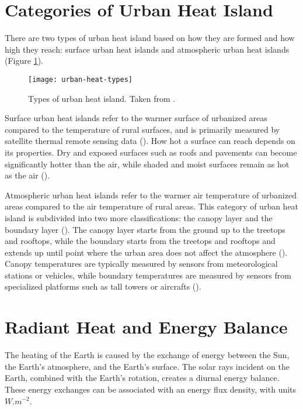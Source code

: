 \section{Categories of Urban Heat Island}
	
	There are two types of urban heat island based on how they are formed and how high they reach:
	surface urban heat islands and atmospheric urban heat islands (Figure \ref{fig:urban-heat-types}).
	
	\begin{figure}
		\centering
		\texttt{[image: urban-heat-types]}
		\caption{Types of urban heat island. Taken from \textcite{Khan2021}.}
		\label{fig:urban-heat-types}
	\end{figure}
	
	Surface urban heat islands refer to the warmer surface of urbanized areas compared to the temperature of rural surfaces, and is primarily measured by satellite thermal remote sensing data (\cite{Zhou2018}). 
	How hot a surface can reach depends on its properties.
	Dry and exposed surfaces such as roofs and pavements can become significantly hotter than the air, while shaded and moist surfaces remain as hot as the air (\cite{Khan2021}). 
	
	Atmospheric urban heat islands refer to the warmer air temperature of urbanized areas compared to the air temperature of rural areas.
	This category of urban heat island is subdivided into two more classifications:
	the canopy layer and the boundary layer (\cite{Zhou2018}).
	The canopy layer starts from the ground up to the treetops and rooftops, 
	while the boundary starts from the treetops and rooftops and extends up until point where the urban area does not affect the atmosphere (\cite{Khan2021}).
	Canopy temperatures are typically measured by sensors from meteorological stations or vehicles,
	while boundary temperatures are measured by sensors from specialized platforms such as tall towers or aircrafts (\cite{Zhou2018}).

\section{Radiant Heat and Energy Balance}
	The heating of the Earth is caused by the exchange of energy between the Sun, the Earth's atmosphere, and the Earth's surface.
	The solar rays incident on the Earth, combined with the Earth's rotation, creates a diurnal energy balance.
	These energy exchanges can be associated with an energy flux density, with units $\si{W.m^{-2}}$.
	
